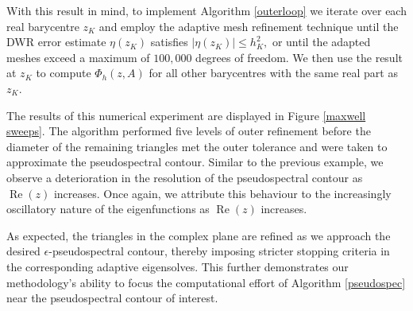 With this result in mind, to implement Algorithm \ref{outerloop} we iterate over each real barycentre $z_K$ and employ the adaptive mesh refinement technique until the DWR error estimate $\eta(z_K)$ satisfies $|\eta(z_K)| \le h_K^2,$ or until the adapted meshes exceed a maximum of $100,000$ degrees of freedom. We then use the result at $z_K$ to compute $\Phi_h(z, A)$ for all other barycentres with the same real part as $z_K$.



The results of this numerical experiment are displayed in Figure \ref{maxwell sweeps}. The algorithm performed five levels of outer refinement before the diameter of the remaining triangles met the outer tolerance and were taken to approximate the pseudospectral contour. Similar to the previous example, we observe a deterioration in the resolution of the pseudospectral contour as $\operatorname{Re}(z)$ increases. Once again, we attribute this behaviour to the increasingly oscillatory nature of the eigenfunctions as $\operatorname{Re}(z) $ increases. 



As expected, the triangles in the complex plane are refined as we approach the desired $\epsilon$-pseudospectral contour, thereby imposing stricter stopping criteria in the corresponding adaptive eigensolves. This further demonstrates our methodology's ability to focus the computational effort of Algorithm \ref{pseudospec} near the pseudospectral contour of interest.

% 







